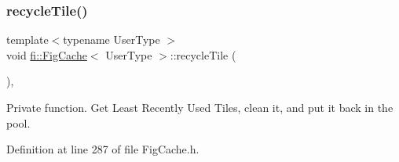 \mbox{\label{classfi_1_1FigCache_a611074d024b48d548a84dbb08c97eb3d}} 
\subsubsection{\texorpdfstring{recycle\+Tile()}{recycleTile()}}
{\footnotesize\ttfamily template$<$typename User\+Type $>$ \\
void \hyperlink{classfi_1_1FigCache}{fi\+::\+Fig\+Cache}$<$ User\+Type $>$\+::recycle\+Tile (\begin{DoxyParamCaption}{ }\end{DoxyParamCaption})\hspace{0.3cm}{\ttfamily [inline]}, {\ttfamily [private]}}



Private function. Get Least Recently Used Tiles, clean it, and put it back in the pool. 



Definition at line 287 of file Fig\+Cache.\+h.

